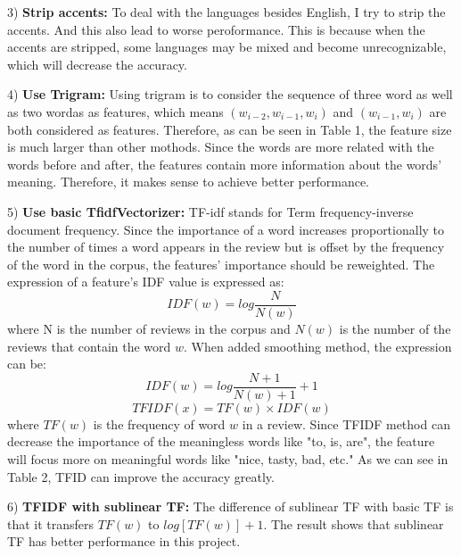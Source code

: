 \documentclass[letterpaper, 10 pt, conference]{ieeeconf}  %
\begin{document}
3) \textbf{Strip accents: }To deal with the languages besides English, I try to strip the accents. And this also lead to worse peroformance. This is because when the accents are stripped, some languages may be mixed and become unrecognizable, which will decrease the accuracy.

4) \textbf{Use Trigram: }Using trigram is to consider the sequence of three word as well as two wordas as features, which means $(w_{i-2},w_{i-1},w_i)$ and $(w_{i-1},w_i)$ are both considered as features. Therefore, as can be seen in Table 1, the feature size is much larger than other mothods. Since the words are more related with the words before and after, the features contain more information about the words' meaning. Therefore, it makes sense to achieve better performance.

5) \textbf{Use basic TfidfVectorizer: }TF-idf stands for Term frequency-inverse document frequency. Since the importance of a word increases proportionally to the number of times a word appears in the review but is offset by the frequency of the word in the corpus, the features' importance should be reweighted. The expression of a feature's IDF value is expressed as:
\begin{equation}
IDF(w)=log\frac{N}{N(w)}
\end{equation}
where N is the number of reviews in the corpus and $N(w)$ is the number of the reviews that contain the word $w$. When added smoothing method, the expression can be:
\begin{equation}
IDF(w)=log\frac{N+1}{N(w)+1}+1
\end{equation}
\begin{equation}
TFIDF(x)=TF(w)\times IDF(w)
\end{equation}
where $TF(w)$ is the frequency of word $w$ in a review. Since TFIDF method can decrease the importance of the meaningless words like "to, is, are", the feature will focus more on meaningful words like "nice, tasty, bad, etc." As we can see in Table 2, TFID can improve the accuracy greatly.

6) \textbf{TFIDF with sublinear TF: }The difference of sublinear TF with basic TF is that it transfers $TF(w)$ to $log[TF(w)]+1$. The result shows that sublinear TF has better performance in this project. 
\end{document}
